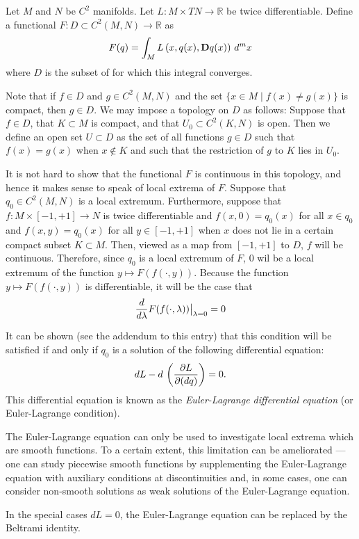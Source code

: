 \documentclass[12pt]{article}
\begin{document}
Let $M$ and $N$ be $C^2$ manifolds.  Let $L \colon M \times TN \to \mathbb{R}$ be twice differentiable.  Define a functional $F \colon D \subset C^2 (M, N) \to \mathbb{R}$ as
 $$F(q) = \int_M L \left( x, q(x), {\bf D} q(x) \right) \, d^m x$$
where $D$ is the subset of  for which this integral converges.

Note that if $f \in D$ and $g \in C^2(M,N)$ and the set $\{ x \in M \mid f(x) \neq g(x) \}$ is compact, then $g \in D$.  We may impose a topology on $D$ as follows: Suppose that $f \in D$, that $K \subset M$ is compact, and that $U_0 \subset C^2 (K,N)$ is open.  Then we define an open set $U \subset D$ as the set of all functions $g \in D$ such that $f(x) = g(x)$ when $x \notin K$ and such that the restriction of $g$ to $K$ lies in $U_0$.

It is not hard to show that the functional $F$ is continuous in this topology, and hence it makes sense to speak of local extrema of $F$.  Suppose that $q_0 \in C^2 (M,N)$ is a local extremum.  Furthermore, suppose that $f \colon M \times [-1,+1] \to N$ is twice differentiable and $f(x,0) = q_0 (x)$ for all $x \in q_0$ and $f(x,y) = q_0 (x)$ for all $y \in [-1,+1]$ when $x$ does not lie in a certain compact subset $K \subset M$.  Then, viewed as a map from $[-1,+1]$ to $D$, $f$ will be continuous.  Therefore, since $q_0$ is a local extremum of $F$, $0$ wil be a local extremum of the function $y \mapsto F (f(\cdot,y))$.  Because the function $y \mapsto F (f(\cdot,y))$ is differentiable, it will be the case that
 $${d \over d\lambda} F (f(\cdot,\lambda)) \big|_{\lambda = 0} = 0$$

It can be shown (see the addendum to this entry) that this condition will be satisfied if and only if $q_0$ is a solution of the following differential equation:
\begin{equation}\label{el}
 dL - d \, \left({\partial L \over \partial(dq)}\right) = 0.
\end{equation}
This differential equation is known as the \emph{Euler-Lagrange differential equation} (or Euler-Lagrange condition).

The Euler-Lagrange equation can only be used to investigate local extrema which are smooth functions.  To a certain extent, this limitation can be ameliorated --- one can study piecewise smooth functions by supplementing the Euler-Lagrange equation with auxiliary conditions at discontinuities and, in some cases, one can consider non-smooth solutions as weak solutions of the Euler-Lagrange equation.

In the special cases $d L = 0$, the Euler-Lagrange equation can be replaced by the Beltrami identity.
\end{document}
